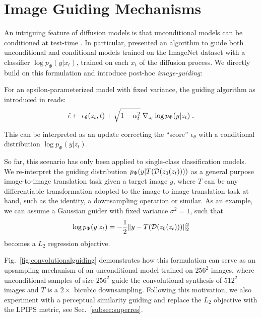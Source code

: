 \documentclass[10pt,twocolumn,letterpaper]{article}
\begin{document}
\newpage
\section{Image Guiding Mechanisms}
\label{subsec:imageguiding}
\convolutionalguiding
An intriguing feature of diffusion models is that unconditional models can be conditioned at test-time \cite{DBLP:journals/corr/abs-2011-13456, DBLP:journals/corr/Sohl-DicksteinW15, DBLP:journals/corr/abs-2105-05233}.
In particular, \cite{DBLP:journals/corr/abs-2105-05233} presented an algorithm to guide both unconditional and conditional models
trained on the ImageNet dataset with a classifier $\log p_{\Phi}(y\vert x_t)$, trained on each $x_t$ of the diffusion process.
We directly build on this formulation and introduce post-hoc \emph{image-guiding}:

For an epsilon-parameterized model with fixed variance, the guiding algorithm as introduced in \cite{DBLP:journals/corr/abs-2105-05233} reads: 
\begin{equation}
\hat{\epsilon} \leftarrow \epsilon_\theta(z_t, t) + \sqrt{1-\alpha_t^2}\; \nabla_{z_t} \log p_{\Phi}(y\vert z_t) \; .
\label{eq:epsilonupdate}
\end{equation}

This can be interpreted as an update correcting the ``score'' $\epsilon_\theta$ with a conditional distribution
$\log p_{\Phi}(y\vert z_t)$. 

So far, this scenario has only been applied to single-class classification models. %
We re-interpret the guiding distribution $p_{\Phi}(y\vert T(\mathcal{D}(z_0(z_t))))$
as a general purpose image-to-image translation task given a target image $y$, 
where $T$ can be any differentiable transformation adopted to the image-to-image translation task at hand, 
such as the identity, a downsampling operation or similar.
\newline
As an example, we can assume a Gaussian guider with fixed variance $\sigma^2=1$, such that
\begin{equation}
\log p_{\Phi}(y\vert z_t) = -\frac{1}{2}\Vert y- T(\mathcal{D}(z_0(z_t))) \Vert^2_2
\end{equation}
becomes a $L_2$ regression objective. %

Fig.~\ref{fig:convolutionalguiding} demonstrates how this formulation can serve as an upsampling mechanism
of an unconditional model trained on $256^2$ images, where unconditional samples of size $256^2$ guide the 
convolutional synthesis of $512^2$ images
 and $T$ is a $2\times$ bicubic downsampling.
Following this motivation, 
we also experiment with a perceptual similarity guiding and replace the $L_2$ objective with
the LPIPS \cite{lpips} metric, see Sec.~\ref{subsec:superres}.
\end{document}
